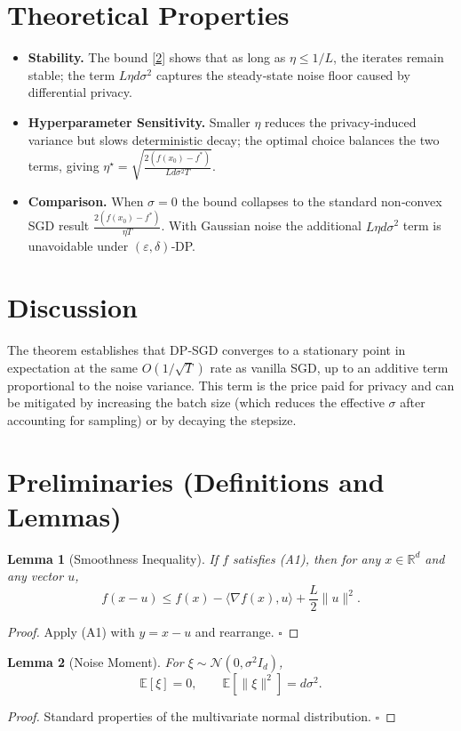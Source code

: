 \documentclass{article}
\newtheorem{lemma}{Lemma}
\newcommand{\E}{\mathbb{E}}
\newcommand{\R}{\mathbb{R}}
\begin{document}
\section*{Theoretical Properties}
\begin{itemize}
\item \textbf{Stability.} The bound \eqref{2} shows that as long as
$\eta\le 1/L$, the iterates remain stable; the term $L\eta d\sigma^{2}$
captures the steady‑state noise floor caused by differential privacy.
\item \textbf{Hyperparameter Sensitivity.} Smaller $\eta$ reduces the
privacy‑induced variance but slows deterministic decay; the optimal
choice balances the two terms, giving $\eta^{\star}= \sqrt{\frac{2(f(x_{0})-f^{*})}{L d\sigma^{2}T}}$.
\item \textbf{Comparison.} When $\sigma=0$ the bound collapses to the
standard non‑convex SGD result $\frac{2(f(x_{0})-f^{*})}{\eta T}$.
With Gaussian noise the additional $L\eta d\sigma^{2}$ term is
unavoidable under $(\varepsilon,\delta)$‑DP.
\end{itemize}

\section*{Discussion}
The theorem establishes that DP‑SGD converges to a stationary point
in expectation at the same $O(1/\sqrt{T})$ rate as vanilla SGD, up to an
additive term proportional to the noise variance.  This term is the
price paid for privacy and can be mitigated by increasing the batch
size (which reduces the effective $\sigma$ after accounting for sampling)
or by decaying the stepsize.

\newpage
\section*{Preliminaries (Definitions and Lemmas)}
\begin{lemma}[Smoothness Inequality]\label{lem:smooth}
If $f$ satisfies (A1), then for any $x\in\R^{d}$ and any vector $u$,
\[
f(x-u)\le f(x)-\langle\nabla f(x),u\rangle+\frac{L}{2}\|u\|^{2}.
\tag{3}
\]
\end{lemma}
\begin{proof}
Apply (A1) with $y=x-u$ and rearrange. \hfill $\square$
\end{proof}

\begin{lemma}[Noise Moment]\label{lem:noise}
For $\xi\sim\mathcal N(0,\sigma^{2}I_{d})$,
\[
\E[\xi]=0,\qquad \E[\|\xi\|^{2}]=d\sigma^{2}.
\tag{4}
\]
\end{lemma}
\begin{proof}
Standard properties of the multivariate normal distribution. \hfill $\square$
\end{proof}
\end{document}
